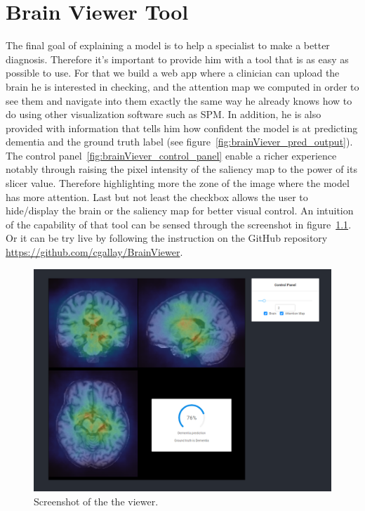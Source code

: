 \chapter{Brain Viewer Tool}
\label{chap:brainviewer}
The final goal of explaining a model is to help a specialist to make a better diagnosis. Therefore it's important to provide him with a tool that is as easy as possible to use. For that we build a web app where a clinician can upload the brain he is interested in checking, and the attention map we computed in order to see them and navigate into them exactly the same way he already knows how to do using other visualization software such as SPM\footnotemark{}. In addition, he is also provided with information that tells him how confident the model is at predicting dementia and the ground truth label (see figure~\ref{fig:brainViever_pred_output}). The control panel~\ref{fig:brainViever_control_panel} enable a richer experience notably through raising the pixel intensity of the saliency map to the power of its slicer value. Therefore highlighting more the zone of the image where the model has more attention. Last but not least the checkbox allows the user to hide/display the brain or the saliency map for better visual control. An intuition of the capability of that tool can be sensed through the screenshot in figure~\ref{fig:brain_viewer}. Or it can be try live by following the instruction on the GitHub repository \href{https://github.com/cgallay/BrainViewer}{https://github.com/cgallay/BrainViewer}.

\begin{figure}
 \centering
 \includegraphics[width=.9\linewidth]{figures/BrainViewer/main.png}
 \captionsetup{width=.9\linewidth}
 \caption{Screenshot of the the viewer.}
 \label{fig:brain_viewer}
\end{figure}

